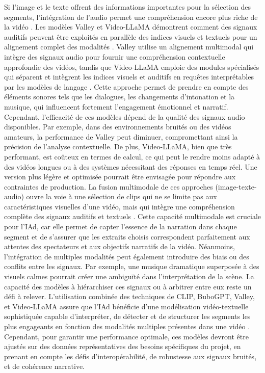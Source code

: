 \documentclass[livre]{udes-genie-these}
\begin{document}
Si l'image et le texte offrent des informations importantes pour la sélection des segments, l'intégration de l'audio permet une compréhension encore plus riche de la vidéo \cite{anonymous2023_videollama}\cite{han2024_clip}. Les modèles Valley et Video-LLaMA démontrent comment des signaux auditifs peuvent être exploités en parallèle des indices visuels et textuels pour un alignement complet des modalités \cite{huang2024_vtimellm}\cite{anonymous2023_valley}. Valley utilise un alignement multimodal qui intègre des signaux audio pour fournir une compréhension contextuelle approfondie des vidéos, tandis que Video-LLaMA emploie des modules spécialisés qui séparent et intègrent les indices visuels et auditifs en requêtes interprétables par les modèles de langage \cite{xu2024}\cite{anonymous2023_valley}. Cette approche permet de prendre en compte des éléments sonores tels que les dialogues, les changements d'intonation et la musique, qui influencent fortement l'engagement émotionnel et narratif.
Cependant, l'efficacité de ces modèles dépend de la qualité des signaux audio disponibles. Par exemple, dans des environnements bruités ou des vidéos amateurs, la performance de Valley peut diminuer, compromettant ainsi la précision de l'analyse contextuelle. De plus, Video-LLaMA, bien que très performant, est coûteux en termes de calcul, ce qui peut le rendre moins adapté à des vidéos longues ou à des systèmes nécessitant des réponses en temps réel. Une version plus légère et optimisée pourrait être envisagée pour répondre aux contraintes de production.
La fusion multimodale de ces approches (image-texte-audio) ouvre la voie à une sélection de clips qui ne se limite pas aux caractéristiques visuelles d'une vidéo, mais qui intègre une compréhension complète des signaux auditifs et textuels \cite{wang2024_hawkeye}\cite{anonymous2017_localizing}. Cette capacité multimodale est cruciale pour l'IAd, car elle permet de capter l'essence de la narration dans chaque segment et de s'assurer que les extraits choisis correspondent parfaitement aux attentes des spectateurs et aux objectifs narratifs de la vidéo. Néanmoins, l'intégration de multiples modalités peut également introduire des biais ou des conflits entre les signaux. Par exemple, une musique dramatique superposée à des visuels calmes pourrait créer une ambiguïté dans l'interprétation de la scène. La capacité des modèles à hiérarchiser ces signaux ou à arbitrer entre eux reste un défi à relever.
L'utilisation combinée des techniques de CLIP, BuboGPT, Valley, et Video-LLaMA assure que l'IAd bénéficie d'une modélisation vidéo-textuelle sophistiquée capable d'interpréter, de détecter et de structurer les segments les plus engageants en fonction des modalités multiples présentes dans une vidéo \cite{chen2023}\cite{anonymous2023_videollama}\cite{xu2024}\cite{wang2024_hawkeye}. Cependant, pour garantir une performance optimale, ces modèles devront être ajustés sur des données représentatives des besoins spécifiques du projet, en prenant en compte les défis d'interopérabilité, de robustesse aux signaux bruités, et de cohérence narrative.
\end{document}

